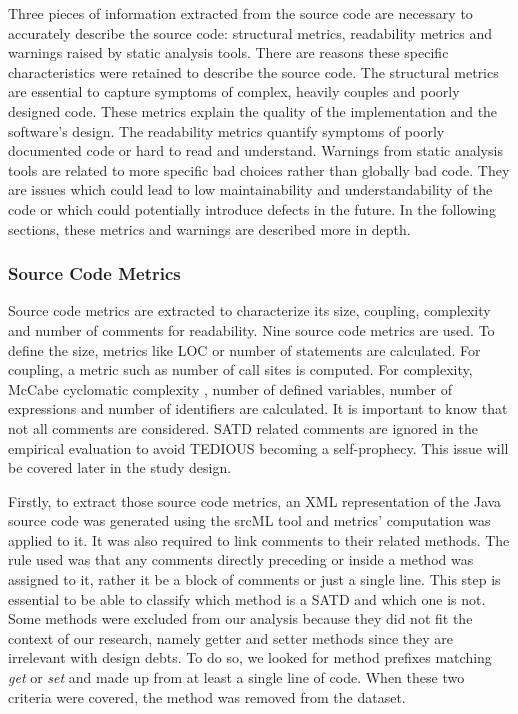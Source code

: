 Three pieces of information extracted from the source code are necessary to accurately describe the source code: structural metrics, readability metrics and warnings raised by static analysis tools. There are reasons these specific characteristics were retained to describe the source code. The structural metrics are essential to capture symptoms of complex, heavily couples and poorly designed code. These metrics explain the quality of the implementation and the software's design. The readability metrics quantify symptoms of poorly documented code or hard to read and understand. Warnings from static analysis tools are related to more specific bad choices rather than globally bad code. They are issues which could lead to low maintainability and understandability of the code or which could potentially introduce defects in the future. In the following sections, these metrics and warnings are described more in depth.

\subsubsection{Source Code Metrics}

Source code metrics are extracted to characterize its size, coupling, complexity and number of comments for readability. Nine source code metrics are used. To define the size, metrics like \ac{LOC} or number of statements are calculated. For coupling, a metric such as number of call sites is computed. For complexity, McCabe cyclomatic complexity \citep{mccabe1990reverse}, number of defined variables, number of expressions and number of identifiers are calculated. It is important to know that not all comments are considered. \ac{SATD} related comments are ignored in the empirical evaluation to avoid \ac{TEDIOUS} becoming a self-prophecy. This issue will be covered later in the study design. \par

Firstly, to extract those source code metrics, an XML representation of the Java source code was generated using the srcML tool \citep{CollardKM03} and metrics' computation was applied to it. It was also required to link comments to their related methods. The rule used was that any comments directly preceding or inside a method was assigned to it, rather it be a block of comments or just a single line. This step is essential to be able to classify which method is a \ac{SATD} and which one is not. Some methods were excluded from our analysis because they did not fit the context of our research, namely getter and setter methods since they are irrelevant with design debts. To do so, we looked for method prefixes matching \emph{get} or \emph{set} and made up from at least a single line of code. When these two criteria were covered, the method was removed from the dataset. \par 

